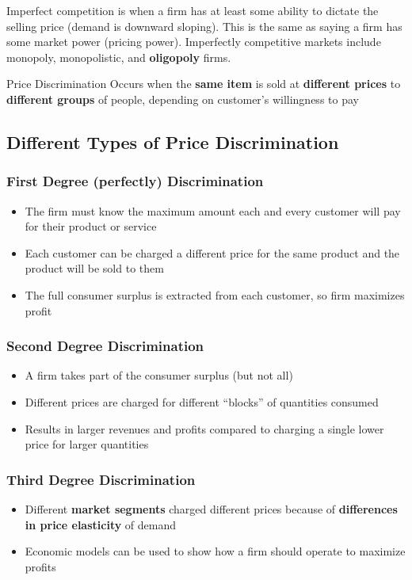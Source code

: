 Imperfect competition is when a firm has at least some ability to dictate the selling price (demand is downward sloping). This is the same as saying a firm has some market power (pricing power). Imperfectly competitive markets include monopoly, monopolistic, and \textbf{oligopoly} firms.

\begin{note}{Price Discrimination}
	Occurs when the \textbf{same item} is sold at \textbf{different prices} to \textbf{different groups} of people, depending on customer's willingness to pay
\end{note}

\subsection{Different Types of Price Discrimination}
\subsubsection{First Degree (perfectly) Discrimination}
\begin{itemize}
	\item The firm must know the maximum amount each and every customer will pay for their product or service
	\item Each customer can be charged a different price for the same product and the product will be sold to them
	\item The full consumer surplus is extracted from each customer, so firm maximizes profit
\end{itemize}

\subsubsection{Second Degree Discrimination}
\begin{itemize}
	\item A firm takes part of the consumer surplus (but not all)
	\item Different prices are charged for different ``blocks'' of quantities consumed
	\item Results in larger revenues and profits compared to charging a single lower price for larger quantities
\end{itemize}

\subsubsection{Third Degree Discrimination}
\begin{itemize}
	\item Different \textbf{market segments} charged different prices because of \textbf{differences in price elasticity} of demand
	\item Economic models can be used to show how a firm should operate to maximize profits
\end{itemize}

